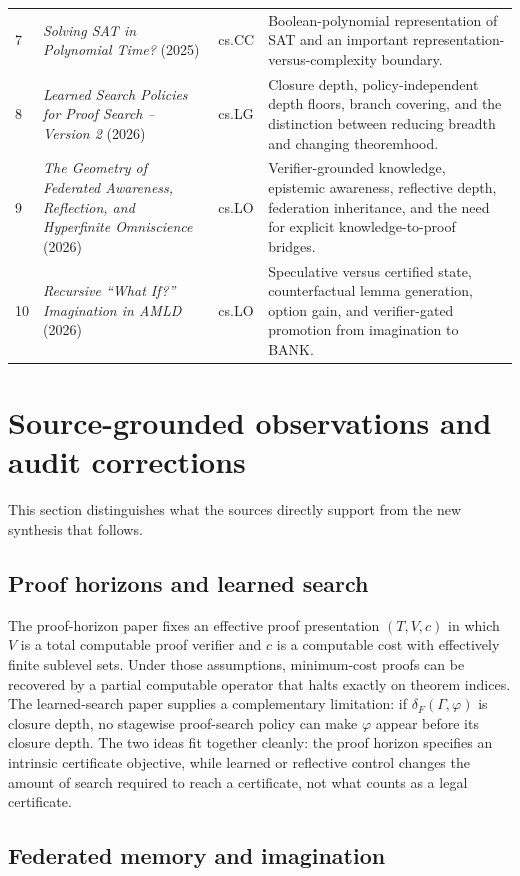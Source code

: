 \documentclass[11pt]{article}
\theoremstyle{special}
\theoremstyle{definition}
\begin{document}
\begin{longtable}{p{}p{}p{}p{}}
7 & \emph{Solving SAT in Polynomial Time?} (2025) & cs.CC & Boolean-polynomial representation of SAT and an important representation-versus-complexity boundary.\\
8 & \emph{Learned Search Policies for Proof Search -- Version 2} (2026) & cs.LG & Closure depth, policy-independent depth floors, branch covering, and the distinction between reducing breadth and changing theoremhood.\\
9 & \emph{The Geometry of Federated Awareness, Reflection, and Hyperfinite Omniscience} (2026) & cs.LO & Verifier-grounded knowledge, epistemic awareness, reflective depth, federation inheritance, and the need for explicit knowledge-to-proof bridges.\\
10 & \emph{Recursive ``What If?'' Imagination in AMLD} (2026) & cs.LO & Speculative versus certified state, counterfactual lemma generation, option gain, and verifier-gated promotion from imagination to BANK.\\
\bottomrule
\end{longtable}

\section{Source-grounded observations and audit corrections}

This section distinguishes what the sources directly support from the new synthesis that follows.

\subsection{Proof horizons and learned search}

The proof-horizon paper fixes an effective proof presentation $(T,V,c)$ in which $V$ is a total computable proof verifier and $c$ is a computable cost with effectively finite sublevel sets. Under those assumptions, minimum-cost proofs can be recovered by a partial computable operator that halts exactly on theorem indices. The learned-search paper supplies a complementary limitation: if $\delta_F(\Gamma,\varphi)$ is closure depth, no stagewise proof-search policy can make $\varphi$ appear before its closure depth. The two ideas fit together cleanly: the proof horizon specifies an intrinsic certificate objective, while learned or reflective control changes the amount of search required to reach a certificate, not what counts as a legal certificate.

\subsection{Federated memory and imagination}
\end{document}
